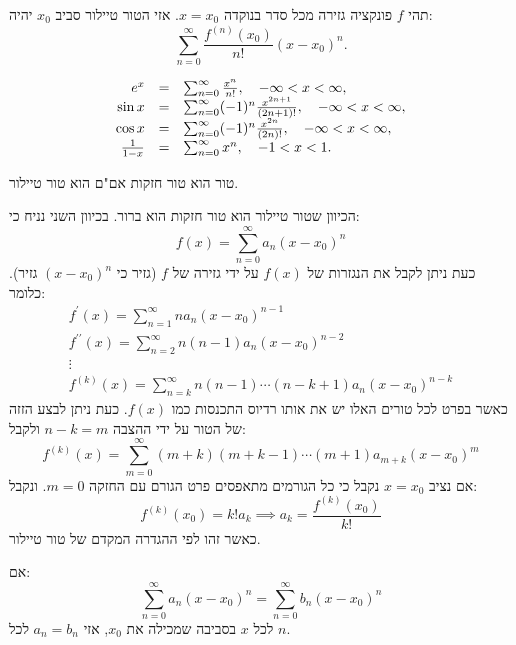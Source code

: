 \documentclass{tstextbook}
\begin{document}
\begin{definition}
תהי \(f\) פונקציה גזירה מכל סדר בנוקדה \(x=x_{0}\). אזי הטור טיילור סביב \(x_{0}\) יהיה:
$$\sum_{n=0}^{\infty}\frac{f^{(n)}(x_{0})}{n!}(x-x_{0})^{n}.$$

\end{definition}
\begin{example}
$$\begin{array}{r c l}{{e^{x}}}&{{=}}&{{\sum_{n=0}^{\infty}\frac{x^{n}}{n!},\quad-\infty<x<\infty,}}\\ {{\sin x}}&{{=}}&{{\sum_{n=0}^{\infty}(-1)^{n}\frac{x^{2n+1}}{(2n+1)!},\quad-\infty<x<\infty,}}\\ {{\cos x}}&{{=}}&{{\sum_{n=0}^{\infty}(-1)^{n}\frac{x^{2n}}{(2n)!},\quad-\infty<x<\infty,}}\\ {{\frac{1}{1-x}}}&{{=}}&{{\sum_{n=0}^{\infty}x^{n},\quad-1<x<1.}}\end{array}$$

\end{example}
\begin{proposition}
טור הוא טור חזקות אם"ם הוא טור טיילור.

\end{proposition}
\begin{definition}
הכיוון שטור טיילור הוא טור חזקות הוא ברור. בכיוון השני נניח כי:
$$f(x)=\sum_{n=0}^{\infty}a_{n}(x-x_{0})^{n}$$
כעת ניתן לקבל את הנגזרות של \(f(x)\) על ידי גזירה של \(f\) (גזיר כי \((x-x_{0})^{n}\) גזיר). כלומר:
\begin{gather*}f^{\prime}(x)=\sum_{n=1}^{\infty}na_{n}(x-x_{0})^{n-1}\\f^{\prime\prime}(x)=\sum_{n=2}^{\infty}n(n-1)a_{n}(x-x_{0})^{n-2}\\ \vdots \\f^{(k)}(x)=\sum_{n=k}^{\infty}n(n-1)\cdots(n-k+1)a_{n}(x-x_{0})^{n-k} 
\end{gather*}
כאשר בפרט לכל טורים האלו יש את אותו רדיוס התכנסות כמו \(f(x)\). כעת ניתן לבצע הזזה של הטור על ידי ההצבה \(n-k=m\) ולקבל:
$$f^{(k)}(x)=\sum_{m=0}^{\infty}(m+k)(m+k-1)\cdots(m+1)a_{m+k}(x-x_{0})^{m}$$
אם נציב \(x=x_{0}\) נקבל כי כל הגורמים מתאפסים פרט הגורם עם החזקה \(m=0\). ונקבל:
$$f^{(k)}(x_{0})=k!a_{k}\implies a_{k}=\frac{f^{(k)}(x_{0})}{k!}$$
כאשר זהו לפי ההגדרה המקדם של טור טיילור.

\end{definition}
\begin{proposition}
אם:
$$\sum_{n=0}^{\infty}a_{n}(x-x_{0})^{n}=\sum_{n=0}^{\infty}b_{n}(x-x_{0})^{n}$$
לכל \(x\) בסביבה שמכילה את \(x_{0}\), אזי \(a_{n}=b_{n}\) לכל \(n\).

\end{proposition}
\end{document}
